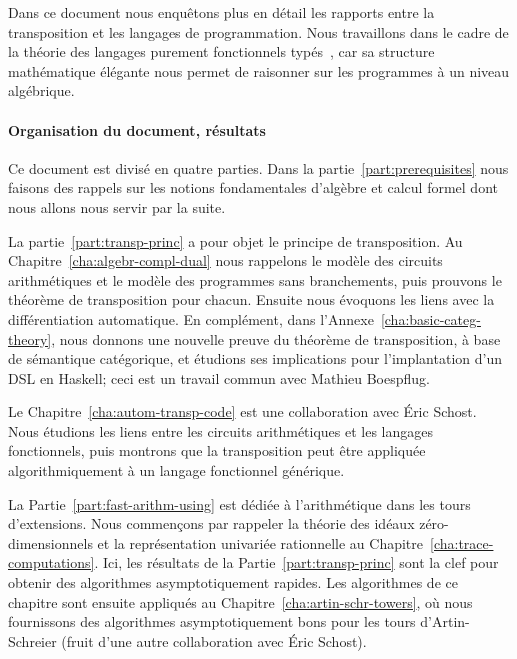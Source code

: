 Dans ce document nous enquêtons plus en détail les rapports entre la
transposition et les langages de programmation. Nous travaillons dans
le cadre de la théorie des langages purement fonctionnels
typés~\cite{pierce}, car sa structure mathématique élégante nous
permet de raisonner sur les programmes à un niveau algébrique.

\paragraph*{Organisation du document, résultats}
Ce document est divisé en quatre parties. Dans la
partie~\ref{part:prerequisites} nous faisons des rappels sur les
notions fondamentales d'algèbre et calcul formel dont nous allons nous
servir par la suite.

La partie~\ref{part:transp-princ} a pour objet le principe de
transposition. Au Chapitre~\ref{cha:algebr-compl-dual} nous rappelons
le modèle des circuits arithmétiques et le modèle des programmes sans
branchements, puis prouvons le théorème de transposition pour
chacun. Ensuite nous évoquons les liens avec la différentiation
automatique. En complément, dans
l'Annexe~\ref{cha:basic-categ-theory}, nous donnons une nouvelle
preuve du théorème de transposition, à base de sémantique catégorique,
et étudions ses implications pour l'implantation d'un DSL en Haskell;
ceci est un travail commun avec Mathieu Boespflug.

Le Chapitre~\ref{cha:autom-transp-code} est une collaboration avec
Éric Schost. Nous étudions les liens entre les circuits arithmétiques
et les langages fonctionnels, puis montrons que la transposition peut
être appliquée algorithmiquement à un langage fonctionnel générique.

La Partie~\ref{part:fast-arithm-using} est dédiée à l'arithmétique
dans les tours d'extensions. Nous commençons par rappeler la théorie
des idéaux zéro-dimensionnels et la représen\-tation univariée
rationnelle au Chapitre~\ref{cha:trace-computations}. Ici, les
résultats de la Partie~\ref{part:transp-princ} sont la clef pour
obtenir des algorithmes asymptotiquement rapides. Les algorithmes de
ce chapitre sont ensuite appliqués au
Chapitre~\ref{cha:artin-schr-towers}, où nous fournissons des
algorithmes asymptotiquement bons pour les tours d'Artin-Schreier
(fruit d'une autre collaboration avec Éric Schost).

